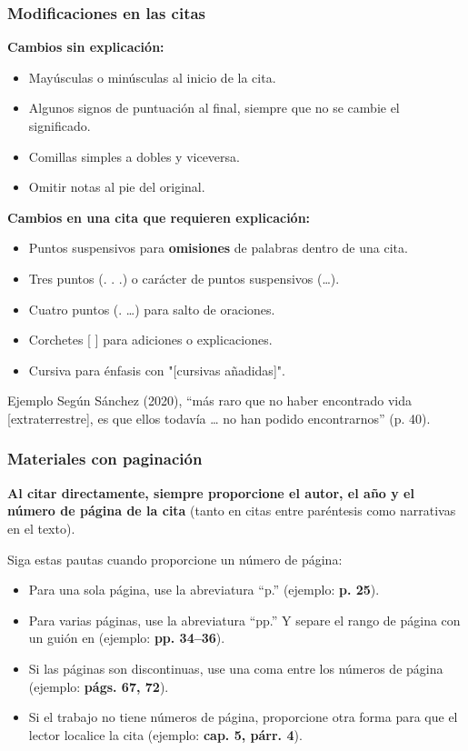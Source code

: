 \documentclass[
11pt, %
]{beamer}
\begin{document}
\begin{frame}
	\frametitle{Modificaciones en las citas}

	\textbf{Cambios sin explicación:}
	\begin{itemize}
		\item Mayúsculas o minúsculas al inicio de la cita.
		\item Algunos signos de puntuación al final, {\color{red}siempre que no se cambie el significado}.
		\item Comillas simples a dobles y viceversa.
		\item Omitir notas al pie del original.
	\end{itemize}

	\textbf{Cambios en una cita que requieren explicación:}
	\begin{itemize}
		\item Puntos suspensivos para \textbf{omisiones} de palabras dentro de una cita.
		\item Tres puntos (. . .) o carácter de puntos suspensivos (…).
		\item Cuatro puntos (. …) para salto de oraciones.
		\item Corchetes [ ] para adiciones o explicaciones.
		\item Cursiva para énfasis con "[cursivas añadidas]".
	\end{itemize}

	\begin{exampleblock}{Ejemplo}
		Según Sánchez (2020), ``más raro que no haber encontrado vida {\color{blue}[extraterrestre]}, es que ellos todavía {\color{blue}…} no han podido encontrarnos'' (p. 40).
	\end{exampleblock}

\end{frame}

\begin{frame}
	\frametitle{Materiales con paginación}

	\textbf{Al citar directamente, siempre proporcione el autor, el año y el número de página de la cita} (tanto en citas entre paréntesis como narrativas en el texto).

	Siga estas pautas cuando proporcione un número de página:
	\begin{itemize}
		\item Para una sola página, use la abreviatura “p.” (ejemplo: \textbf{p. 25}).
		\item Para varias páginas, use la abreviatura “pp.” Y separe el rango de página con un guión en (ejemplo: \textbf{pp. 34–36}).
		\item Si las páginas son discontinuas, use una coma entre los números de página (ejemplo: \textbf{págs. 67, 72}).
		\item Si el trabajo no tiene números de página, proporcione otra forma para que el lector localice la cita (ejemplo: \textbf{cap. 5, párr. 4}).
	\end{itemize}

\end{frame}
\end{document}
